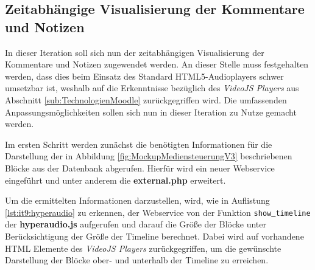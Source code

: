 \subsection{Zeitabhängige Visualisierung der Kommentare und Notizen}
In dieser Iteration soll sich nun der zeitabhängigen Visualisierung der Kommentare und Notizen zugewendet werden. An dieser Stelle muss festgehalten werden, dass dies beim Einsatz des Standard HTML5-Audioplayers schwer umsetzbar ist, weshalb auf die Erkenntnisse bezüglich des \textit{VideoJS Players} aus Abschnitt \ref{sub:TechnologienMoodle} zurückgegriffen wird. Die umfassenden Anpassungsmöglichkeiten sollen sich nun in dieser Iteration zu Nutze gemacht werden.

Im ersten Schritt werden zunächst die benötigten Informationen für die Darstellung der in Abbildung \ref{fig:MockupMediensteuerungV3} beschriebenen Blöcke aus der Datenbank abgerufen. Hierfür wird ein neuer Webservice eingeführt und unter anderem  die \textbf{external.php} erweitert.

Um die ermittelten Informationen darzustellen, wird, wie in Auflistung \ref{lst:it9:hyperaudio} zu erkennen, der Webservice von der Funktion \texttt{show\underline{{ }}timeline} der \textbf{hyperaudio.js} aufgerufen und darauf die Größe der Blöcke unter Berücksichtigung der Größe der Timeline berechnet. Dabei wird auf vorhandene HTML Elemente des \textit{VideoJS Players} zurückgegriffen, um die gewünschte Darstellung der Blöcke ober- und unterhalb der Timeline zu erreichen.

